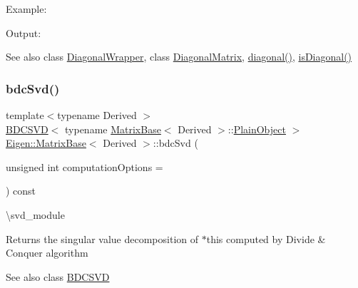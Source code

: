 Example\+: 
\begin{DoxyCodeInclude}{0}
\end{DoxyCodeInclude}
 Output\+: 
\begin{DoxyVerbInclude}
\end{DoxyVerbInclude}


\begin{DoxySeeAlso}{See also}
class \mbox{\hyperlink{class_eigen_1_1_diagonal_wrapper}{Diagonal\+Wrapper}}, class \mbox{\hyperlink{class_eigen_1_1_diagonal_matrix}{Diagonal\+Matrix}}, \mbox{\hyperlink{class_eigen_1_1_matrix_base_ab5768147536273eb2dbdfa389cfd26a3}{diagonal()}}, \mbox{\hyperlink{class_eigen_1_1_matrix_base_a97027ea54c8cd1ddb1c578fee5cedc67}{is\+Diagonal()}} 
\end{DoxySeeAlso}
\mbox{\label{class_eigen_1_1_matrix_base_ae171b74b5d530846ee0836135ffcf837}} 
\subsubsection{\texorpdfstring{bdcSvd()}{bdcSvd()}}
{\footnotesize\ttfamily template$<$typename Derived $>$ \\
\mbox{\hyperlink{class_eigen_1_1_b_d_c_s_v_d}{B\+D\+C\+S\+VD}}$<$ typename \mbox{\hyperlink{class_eigen_1_1_matrix_base}{Matrix\+Base}}$<$ Derived $>$\+::\mbox{\hyperlink{class_eigen_1_1_dense_base_aae45af9b5aca5a9caae98fd201f47cc4}{Plain\+Object}} $>$ \mbox{\hyperlink{class_eigen_1_1_matrix_base}{Eigen\+::\+Matrix\+Base}}$<$ Derived $>$\+::bdc\+Svd (\begin{DoxyParamCaption}\item[{unsigned int}]{computation\+Options = {} }\end{DoxyParamCaption}) const\hspace{0.3cm}{\ttfamily [inline]}}

\textbackslash{}svd\+\_\+module

\begin{DoxyReturn}{Returns}
the singular value decomposition of {\ttfamily $\ast$this} computed by Divide \& Conquer algorithm
\end{DoxyReturn}
\begin{DoxySeeAlso}{See also}
class \mbox{\hyperlink{class_eigen_1_1_b_d_c_s_v_d}{B\+D\+C\+S\+VD}} 
\end{DoxySeeAlso}
\mbox{\label{class_eigen_1_1_matrix_base_a62e662227f0ef8ce077a44a46510507d}} 
